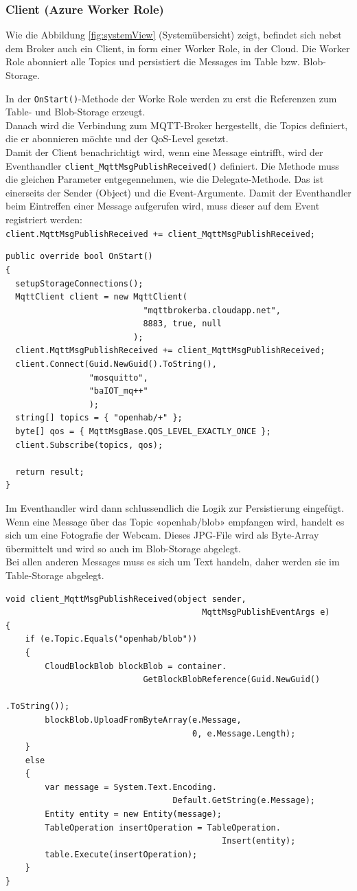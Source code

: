 \subsubsection{Client (Azure Worker Role)}
Wie die Abbildung \ref{fig:systemView} (Systemübersicht) zeigt, befindet sich nebst dem Broker auch ein Client, in form einer Worker Role, in der Cloud. Die Worker Role abonniert alle Topics und persistiert die Messages im Table bzw. Blob-Storage.

In der \lstinline!OnStart()!-Methode der Worke Role werden zu erst die Referenzen zum Table- und Blob-Storage erzeugt. \\
Danach wird die Verbindung zum MQTT-Broker hergestellt, die Topics definiert, die er abonnieren möchte und der QoS-Level gesetzt. \\
Damit der Client benachrichtigt wird, wenn eine Message eintrifft, wird der Eventhandler \lstinline!client_MqttMsgPublishReceived()! definiert. Die Methode muss die gleichen Parameter entgegennehmen, wie die Delegate-Methode. Das ist einerseits der Sender (Object) und die Event-Argumente. Damit der Eventhandler beim Eintreffen einer Message aufgerufen wird, muss dieser auf dem Event registriert werden: \\ \lstinline!client.MqttMsgPublishReceived += client_MqttMsgPublishReceived;! 

\begin{lstlisting}[style=csharp]
public override bool OnStart()
{
  setupStorageConnections();
  MqttClient client = new MqttClient(
            				"mqttbrokerba.cloudapp.net",
               				8883, true, null
               			  );
  client.MqttMsgPublishReceived += client_MqttMsgPublishReceived;
  client.Connect(Guid.NewGuid().ToString(),
  				 "mosquitto",
  				 "baIOT_mq++"
  				 );
  string[] topics = { "openhab/+" };
  byte[] qos = { MqttMsgBase.QOS_LEVEL_EXACTLY_ONCE };
  client.Subscribe(topics, qos);

  return result;
}
\end{lstlisting}

Im Eventhandler wird dann schlussendlich die Logik zur Persistierung eingefügt. Wenn eine Message über das Topic «openhab/blob» empfangen wird, handelt es sich um eine Fotografie der Webcam. Dieses JPG-File wird als Byte-Array übermittelt und wird so auch im Blob-Storage abgelegt. \\
Bei allen anderen Messages muss es sich um Text handeln, daher werden sie im Table-Storage abgelegt.

\begin{lstlisting}[style=csharp]
void client_MqttMsgPublishReceived(object sender,
								   		MqttMsgPublishEventArgs e)
{
	if (e.Topic.Equals("openhab/blob"))
	{
		CloudBlockBlob blockBlob = container.
							GetBlockBlobReference(Guid.NewGuid()
								   							.ToString());
		blockBlob.UploadFromByteArray(e.Message,
									  0, e.Message.Length);
    }
	else
	{
    	var message = System.Text.Encoding.
    							  Default.GetString(e.Message);
		Entity entity = new Entity(message);
		TableOperation insertOperation = TableOperation.
											Insert(entity);
		table.Execute(insertOperation);
	}
}
\end{lstlisting}

